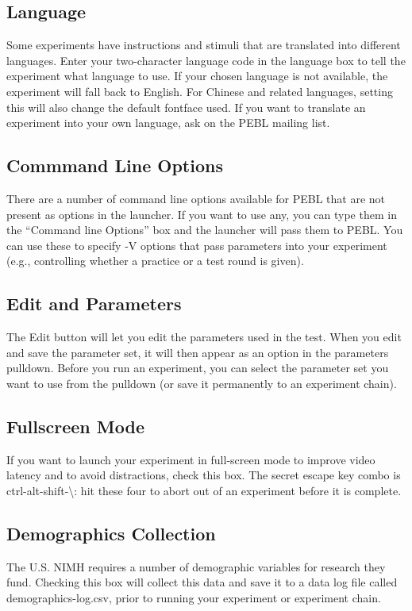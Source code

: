\subsection{Language}
Some experiments have instructions and stimuli that are translated
into different languages.  Enter your two-character language code in
the language box to tell the experiment what language to use. If your
chosen language is not available, the experiment will fall back to
English.  For Chinese and related languages, setting this will also change the default fontface used.  If you want to translate an experiment into your own
language, ask on the PEBL mailing list.



\subsection{Commmand Line Options}
There are a number of command line options available for PEBL that are not present as options in the launcher.  If you want to use any, you can type them in the ``Command line Options'' box and the launcher will pass them to PEBL.  You can use these to specify -V options that pass parameters into your experiment (e.g., controlling whether a practice or a test round is given).


\subsection{Edit and Parameters} The Edit button will let you edit the parameters used in the test.  When you edit and save the parameter set, it will then appear as an option in the parameters pulldown.  Before you run an experiment, you can select the parameter set you want to use from the pulldown (or save it permanently to an experiment chain).


\subsection{Fullscreen Mode}
If you want to launch your experiment in full-screen mode to improve
video latency and to avoid distractions, check this box. The secret
escape key combo is ctrl-alt-shift-\textbackslash : hit these four to abort out of
an experiment before it is complete.

\subsection{Demographics Collection}
The U.S. NIMH requires a number of demographic variables for research
they fund. Checking this box will collect this data and save it to a
data log file called demographics-log.csv, prior to running your experiment or experiment chain.

